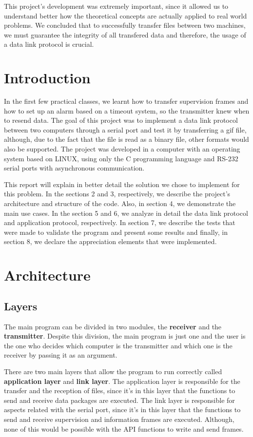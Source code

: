 \documentclass[a4paper]{article}
\begin{document}
This project's development was extremely important, since it allowed us to understand better how the theoretical concepts are actually applied to real world problems. We concluded that to successfully transfer files between two machines, we must guarantee the integrity of all transfered data and therefore, the usage of a data link protocol is crucial.


\section{Introduction}

In the first few practical classes, we learnt how to transfer supervision frames and how to set up an alarm based on a timeout system, so the transmitter knew when to resend data. The goal of this project was to implement a data link protocol between two computers through a serial port and test it by transferring a gif file, although, due to the fact that the file is read as a binary file, other formats would also be supported. The project was developed in a computer with an operating system based on LINUX, using only the C programming language and RS-232 serial ports with asynchronous communication.

This report will explain in better detail the solution we chose to implement for this problem. In the sections 2 and 3, respectively, we describe the project's architecture and structure of the code. Also, in section 4, we demonstrate the main use cases. In the section 5 and 6, we analyze in detail the data link protocol and application protocol, respectively. In section 7, we describe the tests that were made to validate the program and present some results and finally, in section 8, we declare the appreciation elements that were implemented.

\section{Architecture}

\subsection{Layers}
The main program can be divided in two modules, the \textbf{receiver} and the \textbf{transmitter}. Despite this division, the main program is just one and the user is the one who decides which computer is the transmitter and which one is the receiver by passing it as an argument. 

There are two main layers that allow the program to run correctly called \textbf{application layer} and \textbf{link layer}. The application layer is responsible for the transfer and the reception of files, since it's in this layer that the functions to send and receive data packages are executed. The link layer is responsible for aspects related with the serial port, since it's in this layer that the functions to send and receive supervision and information frames are executed. Although, none of this would be possible with the API functions to write and send frames.
\end{document}

